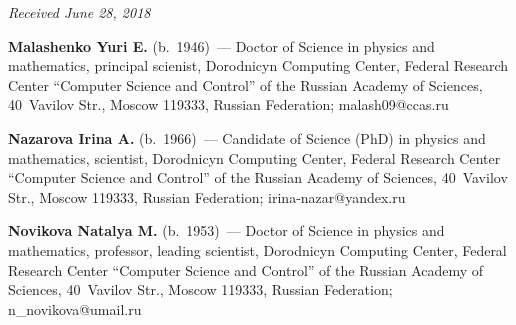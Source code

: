 \vspace*{-9pt}

\hfill{\small\textit{Received June 28, 2018}}

\pagebreak


\Contr


\noindent
\textbf{Malashenko Yuri E.} (b.\ 1946)~--- 
Doctor of Science in physics and mathematics, principal scienist, Dorodnicyn 
Computing Center, Federal Research Center ``Computer Science and Control'' 
of the Russian Academy of Sciences, 40~Vavilov Str., 
Moscow 119333, Russian Federation; \mbox{malash09@ccas.ru}

\vspace*{5pt}

\noindent
\textbf{Nazarova Irina A.} (b.\ 1966)~--- 
Candidate of Science (PhD) in physics and mathematics, scientist, 
Dorodnicyn Computing Center, Federal Research Center 
``Computer Science and Control'' of the Russian Academy of Sciences, 
40~Vavilov Str., Moscow 119333, Russian Federation; \mbox{irina-nazar@yandex.ru}

\vspace*{5pt}

\noindent
\textbf{Novikova Natalya M.} (b.\ 1953)~--- 
Doctor of Science in physics and mathematics,  professor,  leading scientist, 
Dorodnicyn Computing Center, Federal Research Center 
``Computer Science and Control'' of the Russian Academy of Sciences, 
40~Vavilov Str., Moscow 119333, Russian Federation; \mbox{n\_novikova@umail.ru}
\label{end\stat}

\renewcommand{\bibname}{\protect\rm Литература}       